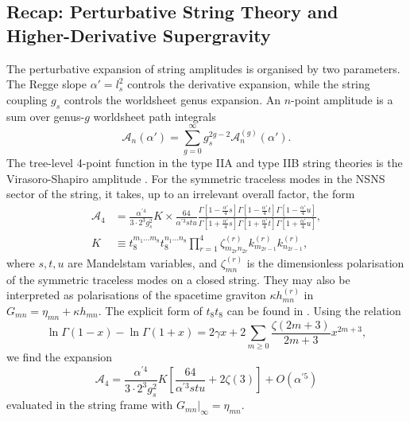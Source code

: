 \subsection{Recap: Perturbative String Theory and Higher-Derivative Supergravity}
The perturbative expansion of string amplitudes is organised by two parameters. The Regge slope $\alpha' = l_s^2$ controls the derivative expansion, while the string coupling $g_s$ controls the worldsheet genus expansion.
An $n$-point amplitude is a sum over genus-$g$ worldsheet path integrals
\begin{equation}
    \mathcal A_n(\alpha') = \sum_{g=0}^\infty g_s^{2g-2} \mathcal A_n^{(g)}(\alpha').
\end{equation}
The tree-level 4-point function in the type IIA and type IIB string theories is the Virasoro-Shapiro amplitude \cite{Green:2012oqa}. 
For the symmetric traceless modes in the NSNS sector of the string, it takes, up to an irrelevant overall factor, the form \cite{Green:1999pv}
\begin{equation}
\begin{aligned}
\mathcal A_4
&=\frac{\alpha^{\prime 4}}{3\cdot 2^3 g_s^2}
K
\times\frac{64}{\alpha^{\prime 3}stu}
\frac{\Gamma[1-\tfrac{\alpha'}{4}s]\Gamma[1-\tfrac{\alpha'}{4}t]\Gamma[1-\tfrac{\alpha'}{4}u]}{\Gamma[1+\tfrac{\alpha'}{4}s]\Gamma[1+\tfrac{\alpha'}{4}t]\Gamma[1+\tfrac{\alpha'}{4}u]},\\
K &\equiv t_8^{m_1...m_8}t_8^{n_1...n_8}               
\prod_{r=1}^4\zeta^{(r)}_{m_{2r}n_{2r}}k^{(r)}_{m_{2r-1}}k^{(r)}_{n_{2r-1}},
\end{aligned}
\end{equation}
where $s,t,u$ are Mandelstam variables, and $\zeta^{(r)}_{mn}$ is the dimensionless polarisation of the symmetric traceless modes on a closed string.
They may also be interpreted as polarisations of the spacetime graviton $\kappa h^{(r)}_{mn}$ in $G_{mn}=\eta_{mn} + \kappa h_{mn}$.
The explicit form of $t_8 t_8$ can be found in \cite{Schwarz:1982jn,Policastro:2008hg,Liu:2025uqu}.
Using the relation
\begin{equation}
\ln\Gamma(1-x)-\ln\Gamma(1+x) = 2\gamma x + 2\sum_{m\ge0}\frac{\zeta(2m+3)}{2m+3}x^{2m+3},
\end{equation}
we find the expansion
\begin{equation}
\mathcal{A}_4 = \frac{\alpha^{\prime 4}}{3\cdot 2^3 g_s^2}
K
\left[ \frac{64}{\alpha^{\prime 3}stu} + 2 \zeta(3)\right]
 + O(\alpha^{\prime 5})
\end{equation}
evaluated in the string frame with $G_{mn} |_{\infty} = \eta_{mn}$.

